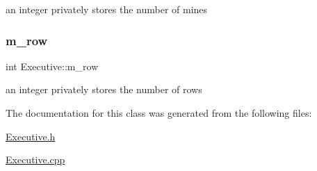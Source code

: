 an integer privately stores the number of mines \mbox{\label{classExecutive_a17f2f07509efcc571fff0a5146064acc}} 
\subsubsection{\texorpdfstring{m\+\_\+row}{m\_row}}
{\footnotesize\ttfamily int Executive\+::m\+\_\+row\hspace{0.3cm}{\ttfamily [private]}}

an integer privately stores the number of rows 

The documentation for this class was generated from the following files\+:\begin{DoxyCompactItemize}
\item 
\hyperlink{Executive_8h}{Executive.\+h}\item 
\hyperlink{Executive_8cpp}{Executive.\+cpp}\end{DoxyCompactItemize}
